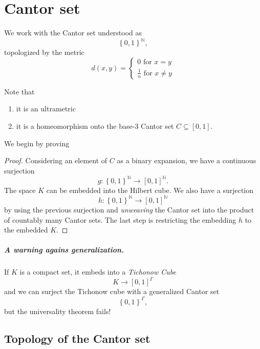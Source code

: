 \chapter{Cantor set}

We work with the Cantor set understood as
\[ 
    \left\{ 0,1  \right\}^{ \mathbb{N} },
\]
topologized by the metric
\[ 
    d(x,y) = 
    \begin{cases}
        0 \text{ for } x = y \\
        \frac{1}{n}\text{ for } x \neq y
   \end{cases}
\]

Note that
\begin{enumerate}
    \item it is an ultrametric
    \item it is a homeomorphism onto the base-3 Cantor set \( C \subseteq [0,1] \).
\end{enumerate}

We begin by proving

\begin{proof}
Considering an element of \( C \) as a binary expansion, we have a continuous surjection
\[ 
    g: \left\{ 0,1 \right\}^{ \mathbb{N} } \to [0,1]^{ \mathbb{N} }.
\]
The space \( K \) can be embedded into the Hilbert cube. We also have a surjection
\[ 
    h: \left\{ 0,1 \right\}^{ \mathbb{N} } \to [0,1]^{ \mathbb{N} }
\]
by using the previous surjection and \emph{unweaving} the Cantor set into the product of countably many Cantor sets. The last step is restricting the embedding \( h \) to the embedded \( K \).
\end{proof}

\paragraph{A warning agains generalization.} If \( K \) is a compact set, it embeds into a \emph{Tichonow Cube}
\[ 
    K \to [0,1]^\Gamma 
\]
and we can surject the Tichonow cube with a generalized Cantor set
\[ 
    \left\{ 0,1 \right\}^{\Gamma},
\]
but the universality theorem fails!

\section{Topology of the Cantor set}

